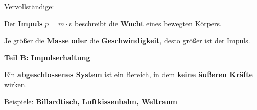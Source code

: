 \documentclass[11pt,a4paper]{article}
\newcommand{\lsg}[1]{\textcolor{loesung}{\underline{\textbf{#1}}}}
\begin{document}
\begin{kasten}

Vervollständige:

\vspace{8pt}

Der \textbf{Impuls} $p = m \cdot v$ beschreibt die \glqq\lsg{Wucht}\grqq{} eines bewegten Körpers.

\vspace{8pt}

Je größer die \lsg{Masse} \textbf{oder} die \lsg{Geschwindigkeit}, desto größer ist der Impuls.

\end{kasten}

\vspace{8mm}


{\large\bfseries\textcolor{physik}{Teil B: Impulserhaltung}}

\vspace{5mm}


\begin{kasten}

Ein \textbf{abgeschlossenes System} ist ein Bereich, in dem \lsg{keine äußeren Kräfte} wirken.

\vspace{5pt}

Beispiele: \lsg{Billardtisch, Luftkissenbahn, Weltraum}

\end{kasten}

\vspace{5mm}

\end{document}
